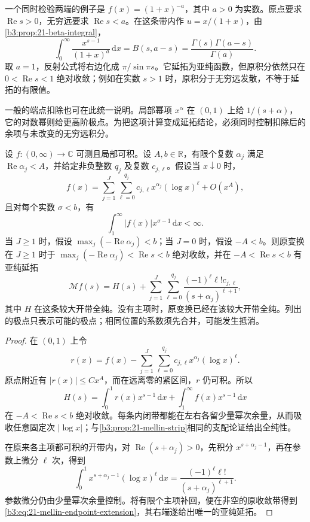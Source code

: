 \ProseParagraphBreak

一个同时检验两端的例子是 \(f(x)=(1+x)^{-a}\)，其中 \(a>0\) 为实数。原点要求 \(\operatorname{Re}s>0\)，无穷远要求 \(\operatorname{Re}s<a\)。在这条带内作 \(u=x/(1+x)\)，由\cref{b3:prop:21-beta-integral}，
\begin{equation}\label{b3:eq:21-mellin-beta}
 \int_0^\infty\frac{x^{s-1}}{(1+x)^a}\,\mathrm dx
 =B(s,a-s)=\frac{\Gamma(s)\Gamma(a-s)}{\Gamma(a)}.
\end{equation}
取 \(a=1\)，反射公式将右边化成 \(\pi/\sin\pi s\)。它延拓为亚纯函数，但原积分依然只在 \(0<\operatorname{Re}s<1\) 绝对收敛；例如在实数 \(s>1\) 时，原积分于无穷远发散，不等于延拓的有限值。

\ProseParagraphBreak

一般的端点扣除也可在此统一说明。局部幂项 \(x^\alpha\) 在 \((0,1)\) 上给 \(1/(s+\alpha)\)，它的对数幂则给更高阶极点。为把这项计算变成延拓结论，必须同时控制扣除后的余项与未改变的无穷远积分。

\begin{proposition}\label{b3:prop:21-mellin-endpoint}
设 \(f:(0,\infty)\to\mathbb C\) 可测且局部可积。设 \(A,b\in\mathbb R\)，有限个复数 \(\alpha_j\) 满足 \(\operatorname{Re}\alpha_j<A\)，并给定非负整数 \(q_j\) 及复数 \(c_{j,\ell}\)。假设当 \(x\downarrow0\) 时，
\[
 f(x)=\sum_{j=1}^J\sum_{\ell=0}^{q_j}
            c_{j,\ell}x^{\alpha_j}(\log x)^\ell+O(x^A),
\]
且对每个实数 \(\sigma<b\)，有
\[
 \int_1^\infty|f(x)|x^{\sigma-1}\,\mathrm dx<\infty.
\]
当 \(J\ge1\) 时，假设 \(\max_j(-\operatorname{Re}\alpha_j)<b\)；当 \(J=0\) 时，假设 \(-A<b\)。则原变换在 \(J\ge1\) 时于 \(\max_j(-\operatorname{Re}\alpha_j)<\operatorname{Re}s<b\) 绝对收敛，并在 \(-A<\operatorname{Re}s<b\) 有亚纯延拓
\begin{equation}\label{b3:eq:21-mellin-endpoint-extension}
 \mathcal Mf(s)=H(s)+\sum_{j=1}^J\sum_{\ell=0}^{q_j}
       \frac{(-1)^\ell\ell!c_{j,\ell}}{(s+\alpha_j)^{\ell+1}},
\end{equation}
其中 \(H\) 在这条较大开带全纯。没有主项时，原变换已经在该较大开带全纯。列出的极点只表示可能的极点；相同位置的系数须先合并，可能发生抵消。
\end{proposition}
\begin{proof}
在 \((0,1)\) 上令
\[
 r(x)=f(x)-\sum_{j=1}^J\sum_{\ell=0}^{q_j}
                   c_{j,\ell}x^{\alpha_j}(\log x)^\ell.
\]
原点附近有 \(|r(x)|\le Cx^A\)，而在远离零的紧区间，\(r\) 仍可积。所以
\[
 H(s)=\int_0^1r(x)x^{s-1}\,\mathrm dx
      +\int_1^\infty f(x)x^{s-1}\,\mathrm dx
\]
在 \(-A<\operatorname{Re}s<b\) 绝对收敛。每条内闭带都能在左右各留少量幂次余量，从而吸收任意固定次 \(|\log x|\)；与\cref{b3:prop:21-mellin-strip}相同的支配论证给出全纯性。

在原来各主项都可积的开带内，对 \(\operatorname{Re}(s+\alpha_j)>0\)，先积分 \(x^{s+\alpha_j-1}\)，再在参数上微分 \(\ell\) 次，得到
\[
 \int_0^1x^{s+\alpha_j-1}(\log x)^\ell\,\mathrm dx
 =\frac{(-1)^\ell\ell!}{(s+\alpha_j)^{\ell+1}}.
\]
参数微分仍由少量幂次余量控制。将有限个主项补回，便在非空的原收敛带得到\eqref{b3:eq:21-mellin-endpoint-extension}，其右端遂给出唯一的亚纯延拓。
\end{proof}

